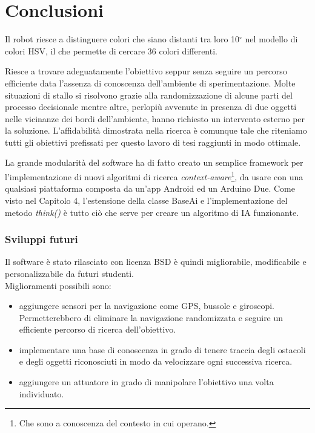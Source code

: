 \chapter*{Conclusioni}
\fancyfoot[C]{\thepage}
Il robot riesce a distinguere colori che siano distanti tra loro 10$^\circ$ nel modello di colori HSV,
il che permette di cercare 36 colori differenti. 

Riesce a trovare adeguatamente 
l'obiettivo seppur senza seguire un percorso efficiente data l'assenza di conoscenza 
dell'ambiente di sperimentazione. Molte situazioni di stallo si risolvono grazie alla randomizzazione 
di alcune parti del processo decisionale mentre altre, perlopiù avvenute in presenza di due 
oggetti nelle vicinanze dei bordi dell'ambiente, hanno richiesto un intervento esterno per la soluzione. 
L'affidabilità dimostrata nella ricerca è comunque tale che riteniamo tutti gli obiettivi 
prefissati per questo lavoro di tesi raggiunti in modo ottimale.

La grande modularità del software ha di fatto creato un semplice framework 
per l'implementazione di nuovi algoritmi di ricerca \emph{context-aware}\footnote{Che sono a conoscenza del contesto in cui operano.}, 
da usare con una qualsiasi piattaforma composta da un'app Android ed un Arduino Due. 
Come visto nel Capitolo 4, l'estensione della
classe BaseAi e l'implementazione del metodo \emph{think()} è tutto ciò che serve per
creare un algoritmo di IA funzionante.
\subsection* {Sviluppi futuri}
Il software è stato rilasciato con licenza BSD è quindi migliorabile, 
modificabile e personalizzabile da futuri studenti.
\\Miglioramenti possibili sono:
\begin{itemize}
\item aggiungere sensori per la navigazione come GPS, 
bussole e giroscopi. Permetterebbero di eliminare la navigazione randomizzata e seguire un efficiente percorso di ricerca dell'obiettivo.
\item implementare una base di conoscenza in grado di tenere traccia degli ostacoli e degli oggetti riconosciuti in modo da velocizzare ogni successiva ricerca.
\item aggiungere un attuatore in grado di manipolare l'obiettivo una volta individuato.
\end{itemize}


